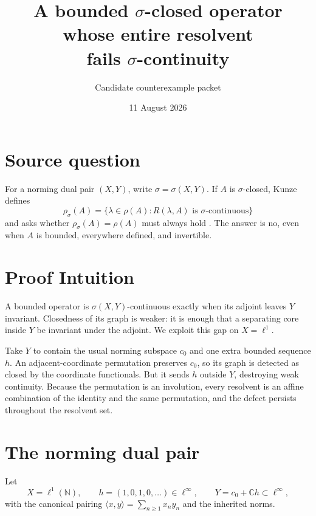\documentclass[11pt]{article}
\title{A bounded $\sigma$-closed operator whose entire resolvent\\fails $\sigma$-continuity}
\author{Candidate counterexample packet}
\date{11 August 2026}
\begin{document}
\maketitle

\begin{center}
\end{center}

\section{Source question}

For a norming dual pair $(X,Y)$, write $\sigma=\sigma(X,Y)$.  If $A$ is
$\sigma$-closed, Kunze defines
\[
 \rho_\sigma(A)=\{\lambda\in\rho(A):R(\lambda,A)
 \text{ is $\sigma$-continuous}\}
\]
and asks whether $\rho_\sigma(A)=\rho(A)$ must always hold
\cite[Section~3]{Kunze}.  The answer is no, even when $A$ is bounded,
everywhere defined, and invertible.

\section{Proof Intuition}

A bounded operator is $\sigma(X,Y)$-continuous exactly when its adjoint
leaves $Y$ invariant.  Closedness of its graph is weaker: it is enough that a
separating core inside $Y$ be invariant under the adjoint.  We exploit this
gap on $X=\ell^1$.

Take $Y$ to contain the usual norming subspace $c_0$ and one extra bounded
sequence $h$.  An adjacent-coordinate permutation preserves $c_0$, so its
graph is detected as closed by the coordinate functionals.  But it sends
$h$ outside $Y$, destroying weak continuity.  Because the permutation is an
involution, every resolvent is an affine combination of the identity and the
same permutation, and the defect persists throughout the resolvent set.

\section{The norming dual pair}

Let
\[
 X=\ell^1(\mathbb N),\qquad
 h=(1,0,1,0,\ldots)\in\ell^\infty,
 \qquad Y=c_0+\mathbb C h\subset\ell^\infty,
\]
with the canonical pairing
$\langle x,y\rangle=\sum_{n\geq1}x_ny_n$ and the inherited norms.
\end{document}
